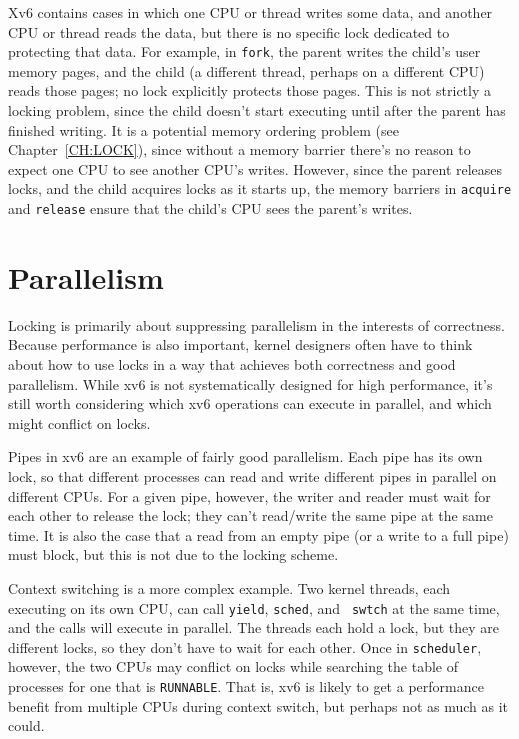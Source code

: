Xv6 contains cases in which one CPU or thread writes some data, and
another CPU or thread reads the data, but there is no specific lock
dedicated to protecting that data. For example, in {\tt fork}, the
parent writes the child's user memory pages, and the child (a
different thread, perhaps on a different CPU) reads those pages; no
lock explicitly protects those pages. This is not strictly a locking
problem, since the child doesn't start executing until after the parent has
finished writing. It is a potential memory ordering problem
(see Chapter~\ref{CH:LOCK}), since without a memory barrier there's no
reason to expect one CPU to see another CPU's writes. However, since
the parent releases locks, and the child acquires locks as it starts
up, the memory barriers in {\tt acquire} and {\tt release}
ensure that the child's CPU sees the parent's writes.

\section{Parallelism}

Locking is primarily about suppressing parallelism in the interests of
correctness. Because performance is also important, kernel designers
often have to think about how to use locks in a way that achieves both
correctness and good parallelism. While xv6 is not systematically
designed for high performance, it's still worth considering which xv6
operations can execute in parallel, and which might conflict on locks.

Pipes in xv6 are an example of fairly good parallelism. Each pipe has
its own lock, so that different processes can read and write 
different pipes in parallel on different CPUs. For a given pipe,
however, the writer and reader must wait for each other to release the
lock; they can't read/write the same pipe at the same time. It is also
the case that a read from an empty pipe (or a write to a full pipe)
must block, but this is not due to the locking scheme.

Context switching is a more complex example. Two kernel threads, each
executing on its own CPU, can call {\tt yield}, {\tt sched}, and {\tt
  swtch} at the same time, and the calls will execute in parallel. The
threads each hold a lock, but they are different locks, so they don't
have to wait for each other. Once in {\tt scheduler}, however, the two
CPUs may conflict on locks while searching the table of processes for
one that is {\tt RUNNABLE}. That is, xv6 is likely to get a
performance benefit from multiple CPUs during context switch, but
perhaps not as much as it could.

